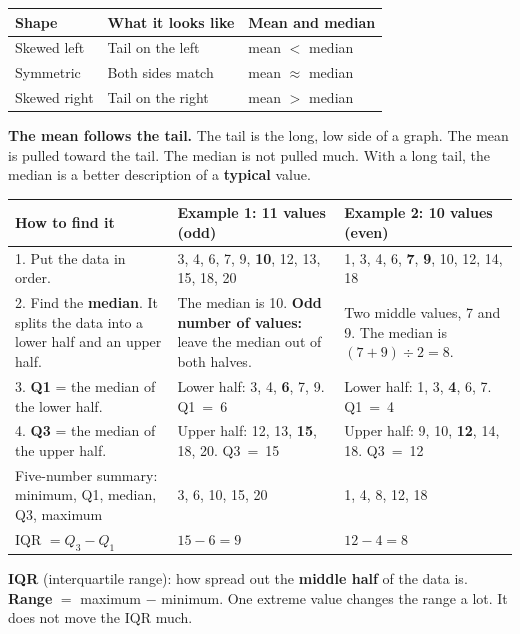 \documentclass[11pt]{article}
\newcommand{\sumhead}[1]{\par\vspace{0.7em}{\large\bfseries #1}\par\vspace{0.3em}}
\begin{document}
\sumhead{Shape}
\begin{tabular}{|L{1.2in}|L{2.95in}|L{2.3in}|}\hline
\textbf{Shape} & \textbf{What it looks like} & \textbf{Mean and median}\\ \hline
Skewed left & Tail on the left & mean $<$ median\\ \hline
Symmetric & Both sides match & mean $\approx$ median\\ \hline
Skewed right & Tail on the right & mean $>$ median\\ \hline
\end{tabular}

\vspace{0.3em}
\textbf{The mean follows the tail.} The tail is the long, low side of a graph. The mean is pulled toward the tail. The median is not pulled much. With a long tail, the median is a better description of a \textbf{typical} value.

\newpage
\sumhead{Quartiles and Spread}
\begin{tabular}{|L{2.05in}|L{2.2in}|L{2.2in}|}\hline
\textbf{How to find it} & \textbf{Example 1: 11 values (odd)} & \textbf{Example 2: 10 values (even)}\\ . Put the data in order. & 3, 4, 6, 7, 9, \textbf{10}, 12, 13, 15, 18, 20 & 1, 3, 4, 6, \textbf{7}, \textbf{9}, 10, 12, 14, 18\\ . Find the \textbf{median}. It splits the data into a lower half and an upper half. & The median is 10. \textbf{Odd number of values:} leave the median out of both halves. & Two middle values, 7 and 9. The median is $(7 + 9) \div 2 = 8$.\\ . \textbf{Q1} = the median of the lower half. & Lower half: 3, 4, \textbf{6}, 7, 9. Q1~=~6 & Lower half: 1, 3, \textbf{4}, 6, 7. Q1~=~4\\ . \textbf{Q3} = the median of the upper half. & Upper half: 12, 13, \textbf{15}, 18, 20. Q3~=~15 & Upper half: 9, 10, \textbf{12}, 14, 18. Q3~=~12\\ \hline
Five-number summary: minimum, Q1, median, Q3, maximum & 3, 6, 10, 15, 20 & 1, 4, 8, 12, 18\\ \hline
IQR $= Q_3 - Q_1$ & $15 - 6 = 9$ & $12 - 4 = 8$\\ \hline
\end{tabular}

\vspace{0.3em}
\textbf{IQR} (interquartile range): how spread out the \textbf{middle half} of the data is. \textbf{Range} $=$ maximum $-$ minimum. One extreme value changes the range a lot. It does not move the IQR much.
\end{document}
